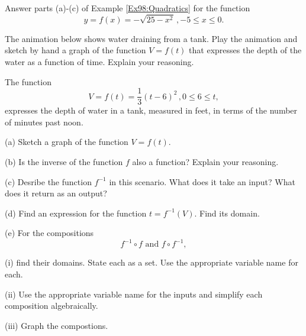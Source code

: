 \documentclass{ximera}
\begin{document}
\begin{example}  \label{Ex96:Quadratics}
Answer parts (a)-(c) of Example \ref{Ex98:Quadratics} for the function
\[
    y=   f(x) = - \sqrt{25-x^2} \, , -5 \leq x \leq 0 .
\]

\end{example}



\begin{exploration} \label{E1:Quadratics}
The animation below shows water draining from a tank. Play the animation and sketch by hand a graph of the function $V=f(t)$ that expresses the depth of the water as a function of time. Explain your reasoning.


 
\begin{onlineOnly}
    \begin{center}
\end{center}
\end{onlineOnly}
\end{exploration}


\begin{example} \label{Ex1:Quadratics}
The function 
\[
     V = f(t) = \frac{1}{3}(t-6)^2 \, , 0\leq 6 \leq t ,
\]
expresses the depth of water in a tank, measured in feet, in terms of the number of minutes past noon. 

(a) Sketch a graph of the function $V=f(t)$.

(b) Is the inverse of the function $f$ also a function? Explain your reasoning.

(c) Desribe the function $f^{-1}$ in this scenario. What does it take an input? What does it return as an output?

(d) Find an expression for the function $t = f^{-1}(V)$. Find its domain.

(e) For the compositions
\[
    f^{-1}\circ f \text{  and  } f\circ f^{-1} ,
\]

(i) find their domains. State each as a set. Use the appropriate variable name for each.

(ii) Use the appropriate variable name for the inputs and simplify each composition algebraically.

(iii) Graph the compostions.


\end{example}
\end{document}
